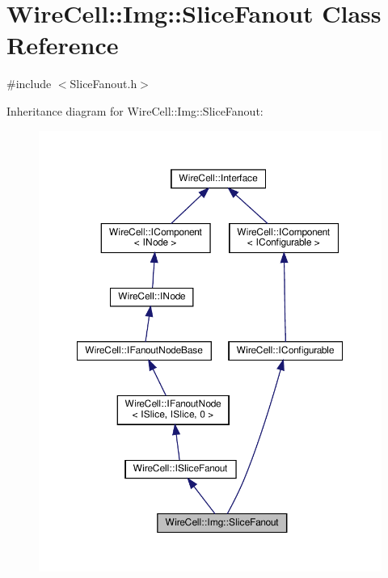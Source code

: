 \hypertarget{class_wire_cell_1_1_img_1_1_slice_fanout}{}\section{Wire\+Cell\+:\+:Img\+:\+:Slice\+Fanout Class Reference}
\label{class_wire_cell_1_1_img_1_1_slice_fanout}


{\ttfamily \#include $<$Slice\+Fanout.\+h$>$}



Inheritance diagram for Wire\+Cell\+:\+:Img\+:\+:Slice\+Fanout\+:
\nopagebreak
\begin{figure}[H]
\begin{center}
\leavevmode
\includegraphics[width=350pt]{class_wire_cell_1_1_img_1_1_slice_fanout__inherit__graph}
\end{center}
\end{figure}


